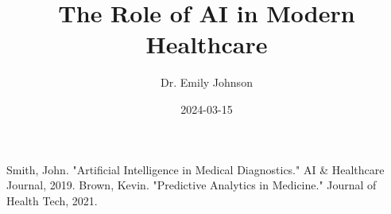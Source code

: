 \documentclass{article}
\title{The Role of AI in Modern Healthcare}
\author{Dr. Emily Johnson}
\date{2024-03-15}
\begin{document}
Smith, John. "Artificial Intelligence in Medical Diagnostics." AI \& Healthcare Journal, 2019.
Brown, Kevin. "Predictive Analytics in Medicine." Journal of Health Tech, 2021.
\end{document}
